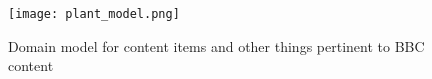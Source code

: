 \documentclass[oribibl]{llncs}
\begin{document}

\begin{figure}
  \begin{center}
    \texttt{[image: plant\_model.png]}
  \end{center}
  \caption{Domain model for content items and other things pertinent to BBC content\label{model}}
\end{figure}
\end{document}
